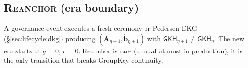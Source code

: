 \subsection{\textsc{Reanchor} (era boundary)}
\label{sec:protocol:reanchor}

A governance event executes a fresh ceremony or Pedersen DKG
(\S\ref{sec:lifecycle:dkg}) producing
$(\mathbf{A}_{\eta+1}, \tilde{\mathbf{b}}_{\eta+1})$ with
$\mathsf{GKH}_{\eta+1} \neq \mathsf{GKH}_\eta$. The new era starts at
$g = 0$, $r = 0$. Reanchor is rare (annual at most in production); it
is the only transition that breaks GroupKey continuity.
